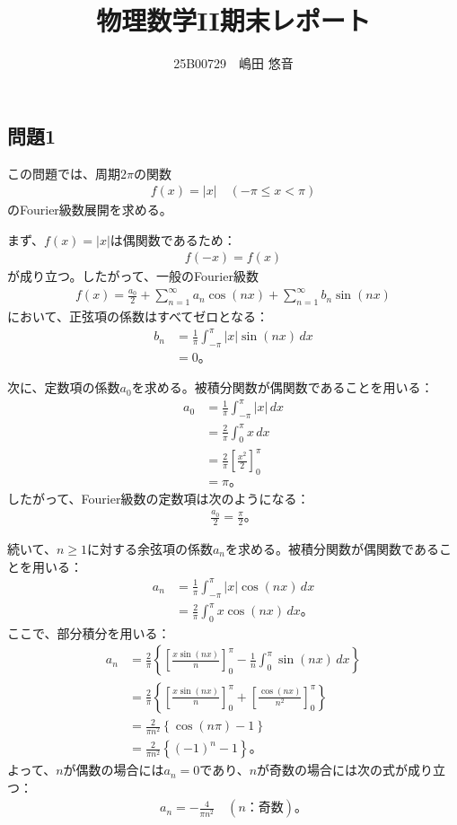 \documentclass[platex,dvipdfmx,a4paper]{jsarticle}
\title{物理数学II期末レポート}
\author{25B00729　嶋田 悠音}
\begin{document}
\maketitle

  \subsection*{問題1}

  この問題では、周期$2\pi$の関数
  \begin{align*}
    f(x)=|x|\quad(-\pi\leq x<\pi)
  \end{align*}
  のFourier級数展開を求める。

  まず、$f(x)=|x|$は偶関数であるため：
  \begin{align*}
    f(-x)=f(x)
  \end{align*}
  が成り立つ。したがって、一般のFourier級数
  \begin{align*}
    f(x)=\frac{a_0}{2}+\sum_{n=1}^{\infty}a_n\cos(nx)+\sum_{n=1}^{\infty}b_n\sin(nx)
  \end{align*}
  において、正弦項の係数はすべてゼロとなる：
  \begin{align*}
    b_n
    &=\frac{1}{\pi}\int_{-\pi}^{\pi}|x|\sin(nx)\,dx\\
    &=0。
  \end{align*}

  次に、定数項の係数$a_0$を求める。被積分関数が偶関数であることを用いる：
  \begin{align*}
    a_0
    &=\frac{1}{\pi}\int_{-\pi}^{\pi}|x|\,dx\\
    &=\frac{2}{\pi}\int_0^\pi x\,dx\\
    &=\frac{2}{\pi}\left[\frac{x^2}{2}\right]_0^\pi\\
    &=\pi。
  \end{align*}
  したがって、Fourier級数の定数項は次のようになる：
  \begin{align*}
    \frac{a_0}{2}=\frac{\pi}{2}。
  \end{align*}

  続いて、$n\geq1$に対する余弦項の係数$a_n$を求める。被積分関数が偶関数であることを用いる：
  \begin{align*}
    a_n
    &=\frac{1}{\pi}\int_{-\pi}^{\pi}|x|\cos(nx)\,dx\\
    &=\frac{2}{\pi}\int_0^\pi x\cos(nx)\,dx。
  \end{align*}
  ここで、部分積分を用いる：
  \begin{align*}
    a_n
    &=\frac{2}{\pi}\left\{
      \left[\frac{x\sin(nx)}{n}\right]_0^\pi
      -\frac{1}{n}\int_0^\pi\sin(nx)\,dx
    \right\}\\
    &=\frac{2}{\pi}\left\{
      \left[\frac{x\sin(nx)}{n}\right]_0^\pi
      +\left[\frac{\cos(nx)}{n^2}\right]_0^\pi
    \right\}\\
    &=\frac{2}{\pi n^2}\left\{\cos(n\pi)-1\right\}\\
    &=\frac{2}{\pi n^2}\left\{(-1)^n-1\right\}。
  \end{align*}
  よって、$n$が偶数の場合には$a_n=0$であり、$n$が奇数の場合には次の式が成り立つ：
  \begin{align*}
    a_n=-\frac{4}{\pi n^2}\quad(n\text{：奇数})。
  \end{align*}
\end{document}
